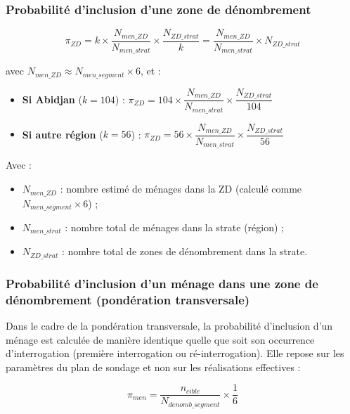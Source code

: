 \documentclass[12pt, a4paper]{article}
\begin{document}
\subsubsection{Probabilité d'inclusion d'une zone de dénombrement}

\begin{equation}
  \pi_{ZD} = k \times \dfrac{N_{men\_ZD}}{N_{men\_strat}} \times \dfrac{N_{ZD\_strat}}{k}
           = \dfrac{N_{men\_ZD}}{N_{men\_strat}} \times N_{ZD\_strat}
\end{equation}

avec $N_{men\_ZD} \approx N_{men\_segment} \times 6$, et :
\begin{itemize}[noitemsep]
  \item \textbf{Si Abidjan} ($k = 104$) :
    $\displaystyle\pi_{ZD} = 104 \times \dfrac{N_{men\_ZD}}{N_{men\_strat}} \times \dfrac{N_{ZD\_strat}}{104}$
  \item \textbf{Si autre région} ($k = 56$) :
    $\displaystyle\pi_{ZD} = 56 \times \dfrac{N_{men\_ZD}}{N_{men\_strat}} \times \dfrac{N_{ZD\_strat}}{56}$
\end{itemize}

Avec :
\begin{itemize}[noitemsep]
  \item $N_{men\_ZD}$ : nombre estimé de ménages dans la ZD (calculé comme $N_{men\_segment} \times 6$) ;
  \item $N_{men\_strat}$ : nombre total de ménages dans la strate (région) ;
  \item $N_{ZD\_strat}$ : nombre total de zones de dénombrement dans la strate.
\end{itemize}

\subsubsection{Probabilité d'inclusion d'un ménage dans une zone de dénombrement (pondération transversale)}

Dans le cadre de la pondération transversale, la probabilité d'inclusion d'un ménage est calculée de manière identique quelle que soit son occurrence d'interrogation (première interrogation ou ré-interrogation). Elle repose sur les paramètres du plan de sondage et non sur les réalisations effectives :

\begin{equation}
  \pi_{men} = \frac{n_{cible}}{N_{denomb\_segment}} \times \frac{1}{6}
\end{equation}
\end{document}
